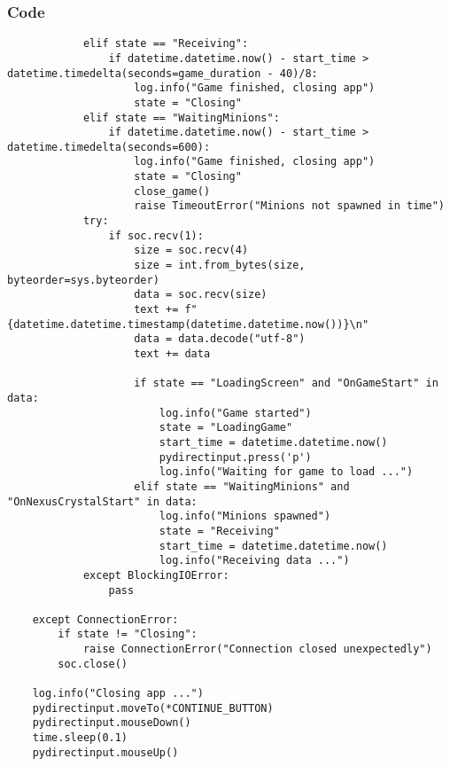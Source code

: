 \documentclass{beamer}
\begin{document}
\begin{frame}[fragile]
    \frametitle{Code}
    \fontsize{3pt}{5pt}\selectfont
    \begin{verbatim}
            elif state == "Receiving":
                if datetime.datetime.now() - start_time > datetime.timedelta(seconds=game_duration - 40)/8:
                    log.info("Game finished, closing app")
                    state = "Closing"
            elif state == "WaitingMinions":
                if datetime.datetime.now() - start_time > datetime.timedelta(seconds=600):
                    log.info("Game finished, closing app")
                    state = "Closing"
                    close_game()
                    raise TimeoutError("Minions not spawned in time")
            try:
                if soc.recv(1):
                    size = soc.recv(4)
                    size = int.from_bytes(size, byteorder=sys.byteorder)
                    data = soc.recv(size)
                    text += f"{datetime.datetime.timestamp(datetime.datetime.now())}\n"
                    data = data.decode("utf-8")
                    text += data

                    if state == "LoadingScreen" and "OnGameStart" in data:
                        log.info("Game started")
                        state = "LoadingGame"
                        start_time = datetime.datetime.now()
                        pydirectinput.press('p')
                        log.info("Waiting for game to load ...")
                    elif state == "WaitingMinions" and "OnNexusCrystalStart" in data:
                        log.info("Minions spawned")
                        state = "Receiving"
                        start_time = datetime.datetime.now()
                        log.info("Receiving data ...")
            except BlockingIOError:
                pass

    except ConnectionError:
        if state != "Closing":
            raise ConnectionError("Connection closed unexpectedly")
        soc.close()

    log.info("Closing app ...")
    pydirectinput.moveTo(*CONTINUE_BUTTON)
    pydirectinput.mouseDown()
    time.sleep(0.1)
    pydirectinput.mouseUp()
    \end{verbatim}
\end{frame}
\end{document}

